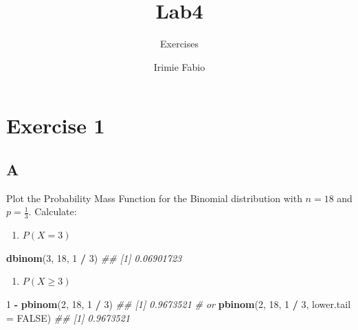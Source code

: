 \documentclass[
]{article}
\title{Lab4}
\subtitle{Exercises}
\author{Irimie Fabio}
\date{}
\newenvironment{Shaded}{\begin{snugshade}}{\end{snugshade}}
\newcommand{\CommentTok}[1]{\textcolor[rgb]{0.56,0.35,0.01}{\textit{#1}}}
\newcommand{\DataTypeTok}[1]{\textcolor[rgb]{0.13,0.29,0.53}{#1}}
\newcommand{\DecValTok}[1]{\textcolor[rgb]{0.00,0.00,0.81}{#1}}
\newcommand{\KeywordTok}[1]{\textcolor[rgb]{0.13,0.29,0.53}{\textbf{#1}}}
\newcommand{\NormalTok}[1]{#1}
\newcommand{\OperatorTok}[1]{\textcolor[rgb]{0.81,0.36,0.00}{\textbf{#1}}}
\newcommand{\OtherTok}[1]{\textcolor[rgb]{0.56,0.35,0.01}{#1}}
\newcommand{\StringTok}[1]{\textcolor[rgb]{0.31,0.60,0.02}{#1}}
\providecommand{\tightlist}{%
  \setlength{\itemsep}{0pt}\setlength{\parskip}{0pt}}
\begin{document}
\maketitle

{
\setcounter{tocdepth}{2}
\tableofcontents
}
\hypertarget{exercise-1}{%
\section{Exercise 1}\label{exercise-1}}

\hypertarget{a}{%
\subsection{A}\label{a}}

Plot the Probability Mass Function for the Binomial distribution with
\(n=18\) and \(p=\frac{1}{3}\). Calculate:

\begin{enumerate}
\def\labelenumi{\arabic{enumi}.}
\tightlist
\item
  \(P(X=3)\)
\end{enumerate}

\begin{Shaded}
\begin{Highlighting}[]
\KeywordTok{dbinom}\NormalTok{(}\DecValTok{3}\NormalTok{, }\DecValTok{18}\NormalTok{, }\DecValTok{1} \OperatorTok{/}\StringTok{ }\DecValTok{3}\NormalTok{)}
\CommentTok{\#\# [1] 0.06901723}
\end{Highlighting}
\end{Shaded}

\begin{enumerate}
\def\labelenumi{\arabic{enumi}.}
\setcounter{enumi}{1}
\tightlist
\item
  \(P(X \ge 3)\)
\end{enumerate}

\begin{Shaded}
\begin{Highlighting}[]
\DecValTok{1} \OperatorTok{{-}}\StringTok{ }\KeywordTok{pbinom}\NormalTok{(}\DecValTok{2}\NormalTok{, }\DecValTok{18}\NormalTok{, }\DecValTok{1} \OperatorTok{/}\StringTok{ }\DecValTok{3}\NormalTok{)}
\CommentTok{\#\# [1] 0.9673521}
\CommentTok{\# or}
\KeywordTok{pbinom}\NormalTok{(}\DecValTok{2}\NormalTok{, }\DecValTok{18}\NormalTok{, }\DecValTok{1} \OperatorTok{/}\StringTok{ }\DecValTok{3}\NormalTok{, }\DataTypeTok{lower.tail =} \OtherTok{FALSE}\NormalTok{)}
\CommentTok{\#\# [1] 0.9673521}
\end{Highlighting}
\end{Shaded}
\end{document}
